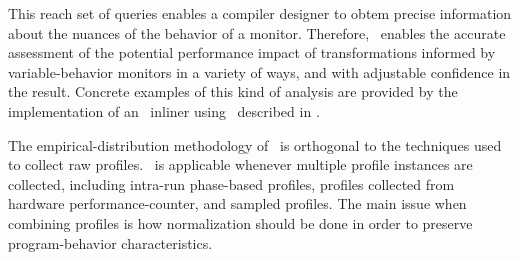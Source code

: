 This reach set of queries enables a compiler designer to obtem precise information about the nuances of the behavior of a monitor. Therefore,
\CP\ enables the accurate assessment of the
potential performance impact of transformations informed by
variable-behavior monitors in a variety of ways, and with adjustable
confidence in the result. Concrete examples of this kind of analysis
are provided by the implementation of an \FDO\ inliner using
\CP\ described in \cite{BerubePhD}.

The empirical-distribution methodology of \CP\ is orthogonal to the
techniques used to collect raw profiles.  \CP\ is applicable whenever
multiple profile instances are collected, including intra-run
phase-based profiles, profiles collected from hardware
performance-counter, and sampled profiles.  The main issue when
combining profiles is how normalization should be done in order to
preserve program-behavior characteristics.
